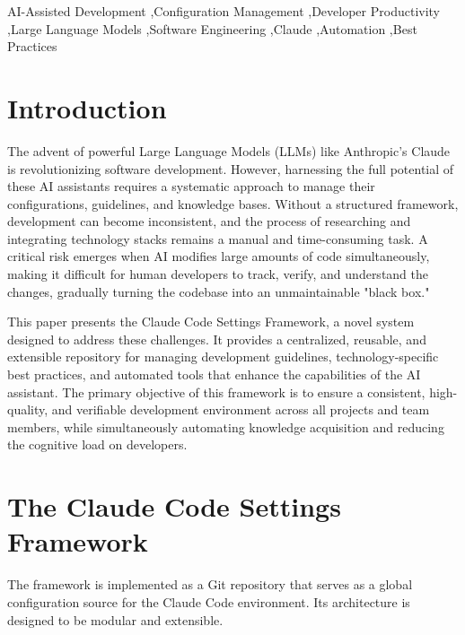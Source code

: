\documentclass[preprint,12pt]{elsarticle}
\begin{document}
\begin{frontmatter}
\begin{keyword}
AI-Assisted Development \sep Configuration Management \sep Developer Productivity \sep Large Language Models \sep Software Engineering \sep Claude \sep Automation \sep Best Practices
\end{keyword}

\end{frontmatter}

\section{Introduction}
The advent of powerful Large Language Models (LLMs) like Anthropic's Claude is revolutionizing software development. However, harnessing the full potential of these AI assistants requires a systematic approach to manage their configurations, guidelines, and knowledge bases. Without a structured framework, development can become inconsistent, and the process of researching and integrating technology stacks remains a manual and time-consuming task. A critical risk emerges when AI modifies large amounts of code simultaneously, making it difficult for human developers to track, verify, and understand the changes, gradually turning the codebase into an unmaintainable "black box."

This paper presents the Claude Code Settings Framework, a novel system designed to address these challenges. It provides a centralized, reusable, and extensible repository for managing development guidelines, technology-specific best practices, and automated tools that enhance the capabilities of the AI assistant. The primary objective of this framework is to ensure a consistent, high-quality, and verifiable development environment across all projects and team members, while simultaneously automating knowledge acquisition and reducing the cognitive load on developers.

\section{The Claude Code Settings Framework}
The framework is implemented as a Git repository that serves as a global configuration source for the Claude Code environment. Its architecture is designed to be modular and extensible.
\end{document}
